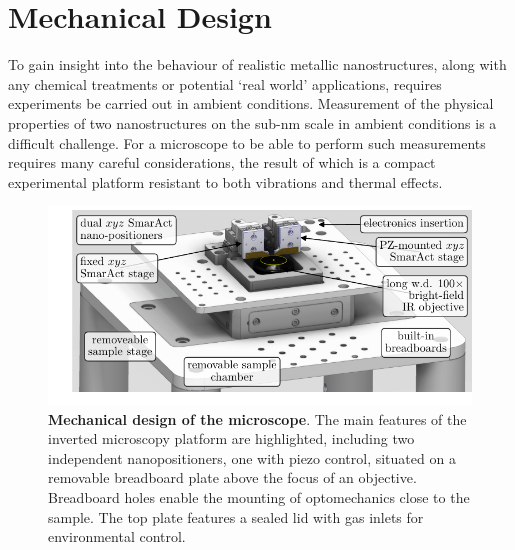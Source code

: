 \documentclass{article}
\begin{document}
\section{Mechanical Design}

To gain insight into the behaviour of realistic metallic nanostructures, along with any chemical treatments or potential `real world' applications, requires experiments be carried out in ambient conditions. Measurement of the physical properties of two nanostructures on the sub-nm scale in ambient conditions is a difficult challenge. For a microscope to be able to perform such measurements requires many careful considerations, the result of which is a compact experimental platform resistant to both vibrations and thermal effects.

\begin{figure}[tb]
\centering
\includegraphics[clip=true, trim=15 10 0 0]{figures/microscope_stage_design}
\caption[Mechanical design of the microscope]{\textbf{Mechanical design of the microscope}. The main features of the inverted microscopy platform are highlighted, including two independent nanopositioners, one with piezo control, situated on a removable breadboard plate above the focus of an objective. Breadboard holes enable the mounting of optomechanics close to the sample. The top plate features a sealed lid with gas inlets for environmental control.}
\label{fig:mechanical_design}
\end{figure}
\end{document}
